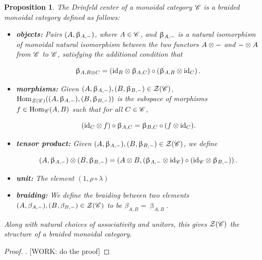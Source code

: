 \documentclass{article}
\newtheorem{proposition}{Proposition}[section]
\theoremstyle{definition}
\numberwithin{figure}{section}
\begin{document}
\begin{proposition} The Drinfeld center of a monoidal category $\mathscr{C}$ is a braided monoidal category defined as follows:

\begin{itemize}
\item \textbf{objects:} Pairs $(A,\upbeta_{A,\--})$, where $A\in \mathscr{C}$, and $\upbeta_{A,\--}$ is a natural isomorphism of monoidal natural isomorphism between the two functors $A\otimes \--$ and $\--\otimes A$ from $\mathscr{C}$ to $\mathscr{C}$, satisfying the additional condition that

$$\upbeta_{A,B\otimes C}=\left(\mathrm{id}_{B}\otimes \upbeta_{A,C}\right)\circ \left(\upbeta_{A,B}\otimes \mathrm{id}_C\right).$$

\item \textbf{morphisms:} Given $(A,\upbeta_{A,\--}), (B,\upbeta_{B,\--})\in \mathcal{Z}(\mathscr{C})$, $\mathrm{Hom}_{\mathcal{Z}(\mathscr{C})}((A,\upbeta_{A,\--}),(B,\upbeta_{B,\--}))$ is the subspace of morphisms $f\in \mathrm{Hom}_{\mathscr{C}}(A,B)$ such that for all $C\in \mathscr{C}$,

$$\left(\mathrm{id}_{C}\otimes f\right)\circ \upbeta_{A,C}=\upbeta_{B,C}\circ (f\otimes \mathrm{id}_C).$$

\item \textbf{tensor product:} Given $(A,\upbeta_{A,\--}), (B,\upbeta_{B,\--})\in \mathcal{Z}(\mathscr{C})$, we define

$$(A,\upbeta_{A,\--})\otimes (B,\upbeta_{B,\--})=\left(A\otimes B, (\upbeta_{A,\--}\otimes \mathrm{id}_{\mathscr{C}})\circ (\mathrm{id}_{\mathscr{C}}\otimes \upbeta_{B,\--}) \right).$$

\item \textbf{unit: } The element $(1,\rho\circ \lambda)$

\item \textbf{braiding: } We define the braiding between two elements $(A,\beta_{A,\--}), (B,\beta_{B,\--})\in \mathcal{Z}(\mathscr{C})$ to be $\beta_{A,B}=\upbeta_{A,B}$.
\end{itemize}

Along with natural choices of associativity and unitors, this gives $\mathcal{Z}(\mathscr{C})$ the structure of a braided monoidal category.
\end{proposition}
\begin{proof}. [WORK: do the proof]
\end{proof}
\end{document}
